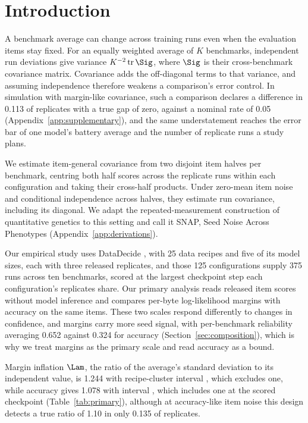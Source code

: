 \section{Introduction}
A benchmark average can change across training runs even when the evaluation items stay fixed. For an equally weighted average of $K$ benchmarks, independent run deviations give variance $K^{-2}\operatorname{tr}\Sig$, where $\Sig$ is their cross-benchmark covariance matrix. Covariance adds the off-diagonal terms to that variance, and assuming independence therefore weakens a comparison's error control. In simulation with margin-like covariance, such a comparison declares a difference in 0.113 of replicates with a true gap of zero, against a nominal rate of 0.05 (Appendix~\ref{app:supplementary}), and the same understatement reaches the error bar of one model's battery average and the number of replicate runs a study plans.

We estimate item-general covariance from two disjoint item halves per benchmark, centring both half scores across the replicate runs within each configuration and taking their cross-half products. Under zero-mean item noise and conditional independence across halves, they estimate run covariance, including its diagonal. We adapt the repeated-measurement construction of quantitative genetics to this setting and call it SNAP, Seed Noise Across Phenotypes (Appendix~\ref{app:derivations}).

Our empirical study uses DataDecide \citep{magnusson2025}, with 25 data recipes and five of its model sizes, each with three released replicates, and those 125 configurations supply 375 runs across ten benchmarks, scored at the largest checkpoint step each configuration's replicates share. Our primary analysis reads released item scores without model inference and compares per-byte log-likelihood margins with accuracy on the same items. These two scales respond differently to changes in confidence, and margins carry more seed signal, with per-benchmark reliability averaging 0.652 against 0.324 for accuracy (Section~\ref{sec:composition}), which is why we treat margins as the primary scale and read accuracy as a bound.

Margin inflation $\Lam$, the ratio of the average's standard deviation to its independent value, is 1.244 with recipe-cluster interval , which excludes one, while accuracy gives 1.078 with interval , which includes one at the scored checkpoint (Table~\ref{tab:primary}), although at accuracy-like item noise this design detects a true ratio of 1.10 in only 0.135 of replicates.


